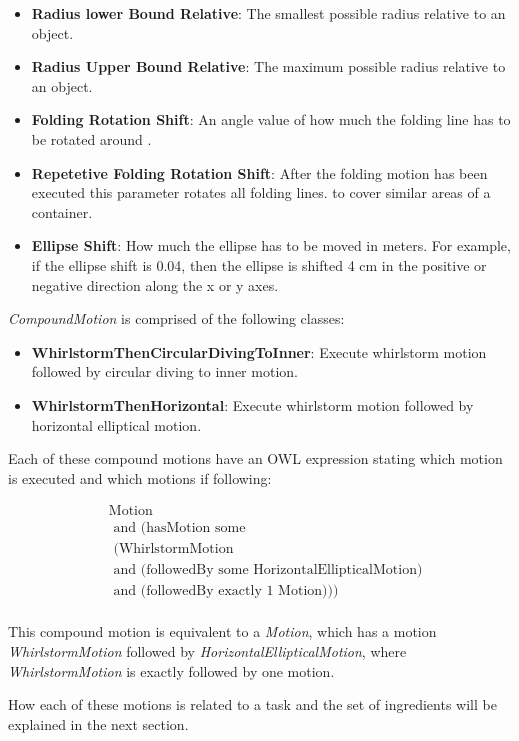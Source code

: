 \begin{itemize}
    \item \textbf{Radius lower Bound Relative}: The smallest possible radius relative to an object.
    \item \textbf{Radius Upper Bound Relative}: The maximum possible radius relative to an object.
    \item \textbf{Folding Rotation Shift}: An angle value of how much the folding line has to be rotated around .
    \item \textbf{Repetetive Folding Rotation Shift}: After the folding motion has been executed this parameter rotates all folding lines.
     to cover similar areas of a container. 
    \item \textbf{Ellipse Shift}: How much the ellipse has to be moved in meters. For example, if the ellipse shift is 0.04, then the ellipse
     is shifted 4 cm in the positive or negative direction along the x or y axes.
\end{itemize}

\textit{CompoundMotion} is comprised of the following classes:
\begin{itemize}
    \item \textbf{WhirlstormThenCircularDivingToInner}: Execute whirlstorm motion followed by circular diving to inner motion.
    \item \textbf{WhirlstormThenHorizontal}: Execute whirlstorm motion followed by horizontal elliptical motion.
\end{itemize}

Each of these compound motions have an OWL expression stating which motion is executed and which motions if following:

\[
	\begin{aligned}
	&\text{Motion}\\
    &\text{ and (hasMotion some}\\
    &\text{      (WhirlstormMotion}\\
    &\text{       and (followedBy some HorizontalEllipticalMotion)}\\
	&\text{     and (followedBy exactly 1 Motion)))}\\
	\end{aligned}
\]

This compound motion is equivalent to a \textit{Motion}, which has a motion \textit{WhirlstormMotion} followed by 
\textit{HorizontalEllipticalMotion}, where \textit{WhirlstormMotion} is exactly followed by one motion. 

How each of these motions is related to a task and the set of ingredients will be explained in the next section.

